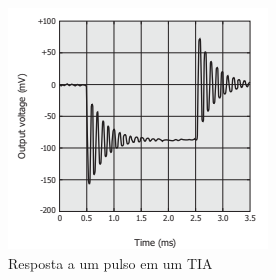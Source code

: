 \begin{figure}[htb]
	\caption{\label{figura_respostaTIA2}Resposta a um pulso em um TIA}
	\begin{center}
	    \includegraphics[scale=1]{Imagens/RespostaEspectralTIA2.png}
	\end{center}
\end{figure}

\clearpage